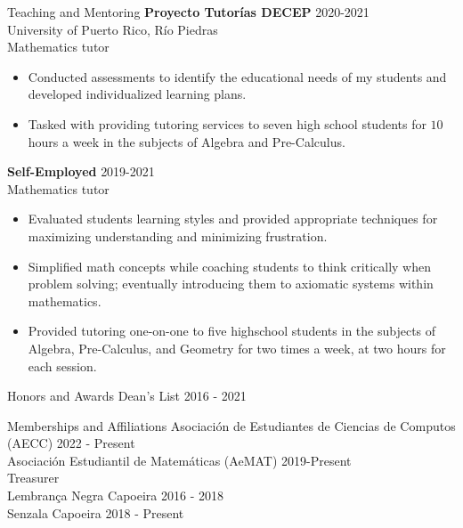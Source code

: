 \documentclass{resume} %
\begin{document}
\begin{rSection}{Teaching and Mentoring}
    \textbf{Proyecto Tutor\'ias DECEP} \hfill{2020-2021} \\
    University of Puerto Rico, R\'io Piedras \\
    Mathematics tutor
    \begin{itemize}
        \item Conducted assessments to identify the educational needs of my
            students and developed individualized learning plans.

        \item Tasked with providing tutoring services to seven high school
            students for $10$ hours a week in the subjects of Algebra and
            Pre-Calculus.
    \end{itemize}

    \textbf{Self-Employed} \hfill{2019-2021} \\
    Mathematics tutor

    \begin{itemize}
        \item Evaluated students learning styles and provided appropriate
            techniques for maximizing understanding and minimizing frustration.

        \item Simplified math concepts while coaching students to think
            critically when problem solving; eventually introducing them to
            axiomatic systems within mathematics.

        \item Provided tutoring one-on-one to five highschool students in the
            subjects of Algebra, Pre-Calculus, and Geometry for two times a
            week, at two hours for each session.
    \end{itemize}
\end{rSection}

\begin{rSection}{Honors and Awards}
    Dean's List \hfill{2016 - 2021}
\end{rSection}

\begin{rSection}{Memberships and Affiliations}
    Asociaci\'on de Estudiantes de Ciencias de Computos (AECC) \hfill{2022 - Present} \\
    Asociaci\'on Estudiantil de Matem\'aticas (AeMAT) \hfill{2019-Present} \\
    \hspace*{17mm} Treasurer    \\
    Lembran\c{c}a Negra Capoeira \hfill{2016 - 2018} \\
    Senzala Capoeira \hfill{2018 - Present} \\
\end{rSection}
\end{document}
